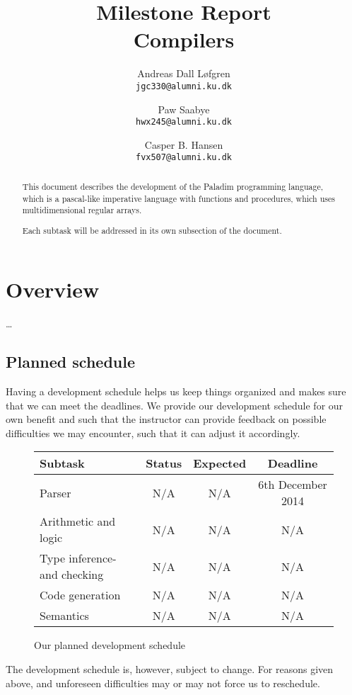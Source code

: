 \documentclass[11pt]{article}
\title%
{%
	{\large Milestone Report}\\
	Compilers
}
\author%
{%
	Andreas Dall Løfgren\\
	{\tt jgc330@alumni.ku.dk}
	\and
	Paw Saabye\\
	{\tt hwx245@alumni.ku.dk}
	\and
	Casper B. Hansen\\
	{\tt fvx507@alumni.ku.dk}
}
\begin{document}
\clearpage
\maketitle
\thispagestyle{empty}
\begin{multicols}{2}
\begin{abstract}
This document describes the development of the Paladim programming language,
which is a pascal-like imperative language with functions and procedures, which
uses multidimensional regular arrays.

Each subtask will be addressed in its own subsection of the document.
\end{abstract}
\vfill
\columnbreak%
\tableofcontents
\end{multicols}

\clearpage
\section{Overview}
\ldots

\subsection{Planned schedule}
Having a development schedule helps us keep things organized and makes sure
that we can meet the deadlines. We provide our development schedule for our
own benefit and such that the instructor can provide feedback on possible
difficulties we may encounter, such that it can adjust it accordingly.
\begin{figure}[H]
	\centering
	\begin{tabular}{|l|c|c|c|}
		\hline
		{\bf Subtask} & {\bf Status} & {\bf Expected} & {\bf Deadline} \\ \hline
		Parser & N/A & N/A & 6th December 2014 \\ \hline
		Arithmetic and logic & N/A & N/A & N/A \\ \hline
		Type inference- and checking & N/A & N/A & N/A \\ \hline
		Code generation & N/A & N/A & N/A \\ \hline
		Semantics & N/A & N/A & N/A \\ \hline
	\end{tabular}
	\label{table:schedule}
	\caption{Our planned development schedule}
\end{figure}
The development schedule is, however, subject to change. For reasons given
above, and unforeseen difficulties may or may not force us to reschedule.
\end{document}
